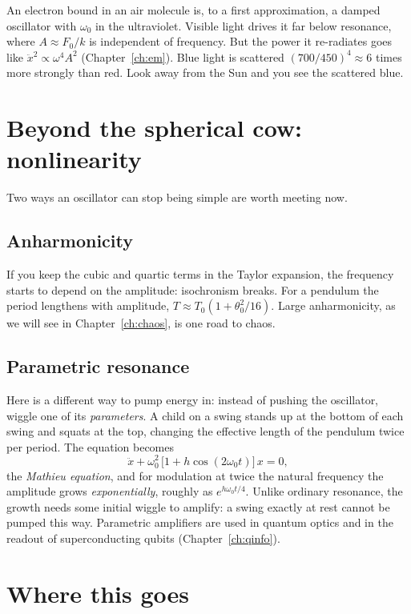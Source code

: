 \begin{example}
An electron bound in an air molecule is, to a first approximation, a damped oscillator with $\omega_0$ in the ultraviolet. Visible light drives it far below resonance, where $A\approx F_0/k$ is independent of frequency. But the power it re-radiates goes like $\ddot x^2 \propto \omega^4 A^2$ (Chapter~\ref{ch:em}). Blue light is scattered $(700/450)^4\approx 6$ times more strongly than red. Look away from the Sun and you see the scattered blue.
\end{example}

\section{Beyond the spherical cow: nonlinearity}

Two ways an oscillator can stop being simple are worth meeting now.

\subsection{Anharmonicity}
If you keep the cubic and quartic terms in the Taylor expansion, the frequency starts to depend on the amplitude: isochronism breaks. For a pendulum the period lengthens with amplitude, $T\approx T_0(1+\theta_0^2/16)$. Large anharmonicity, as we will see in Chapter~\ref{ch:chaos}, is one road to chaos.

\subsection{Parametric resonance}
Here is a different way to pump energy in: instead of pushing the oscillator, wiggle one of its \emph{parameters}. A child on a swing stands up at the bottom of each swing and squats at the top, changing the effective length of the pendulum twice per period. The equation becomes
\[
  \ddot x + \omega_0^2\,\big[1 + h\cos(2\omega_0 t)\big]\,x = 0,
\]
the \emph{Mathieu equation}, and for modulation at twice the natural frequency the amplitude grows \emph{exponentially}, roughly as $e^{h\omega_0 t/4}$. Unlike ordinary resonance, the growth needs some initial wiggle to amplify: a swing exactly at rest cannot be pumped this way. Parametric amplifiers are used in quantum optics and in the readout of superconducting qubits (Chapter~\ref{ch:qinfo}).

\section{Where this goes}

